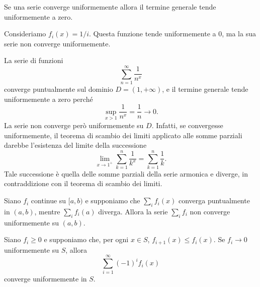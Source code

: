 \documentclass[a4paper]{article}
\begin{document}
\begin{radioactive}
\begin{snippetproposition}{}
    Se una serie converge uniformemente allora il termine generale tende uniformemente a zero.
\end{snippetproposition}
\end{radioactive}

\begin{radioactive}
\begin{snippetexercise}{}
    Consideriamo \(f_i(x) = 1/i\). Questa funzione tende uniformemente a \(0\),
    ma la sua serie non converge uniformemente.
\end{snippetexercise}
\end{radioactive}

\begin{radioactive}
\begin{snippetexercise}{}
    La serie di funzioni
    \[
        \sum_{n=1}^\infty\frac1{n^x}
    \]
    converge puntualmente sul dominio \(D=(1,+\infty)\), e il termine generale tende
    uniformemente a zero perché
    \[
        \sup_{x>1}\frac1{n^x}=\frac1n\longrightarrow0.
    \]
    La serie non converge però uniformemente su \(D\). Infatti, se convergesse
    uniformemente, il teorema di scambio dei limiti applicato alle somme parziali darebbe
    l'esistenza del limite della successione
    \[
        \lim_{x\to1^+}\sum_{k=1}^n\frac1{k^x}
        =\sum_{k=1}^n\frac1k.
    \]
    Tale successione è quella delle somme parziali della serie armonica e diverge,
    in contraddizione con il teorema di scambio dei limiti.
\end{snippetexercise}
\end{radioactive}

\begin{radioactive}
\begin{snippetproposition}{}
    Siano \(f_i\) continue su \([a,b)\) e supponiamo che \(\sum_i f_i(x)\)
    converga puntualmente in \((a,b)\), mentre \(\sum_i f_i(a)\) diverga.
    Allora la serie \(\sum_i f_i\) non converge uniformemente su \((a,b)\).
\end{snippetproposition}
\end{radioactive}

\begin{radioactive}
\begin{snippetproposition}{}
    Siano \(f_i\geq0\) e supponiamo che, per ogni \(x\in S\),
    \(f_{i+1}(x)\leq f_i(x)\). Se \(f_i\to0\) uniformemente su \(S\), allora
    \[
        \sum_{i=1}^\infty {(-1)}^i f_i(x)
    \]
    converge uniformemente in \(S\).
\end{snippetproposition}
\end{radioactive}
\end{document}
